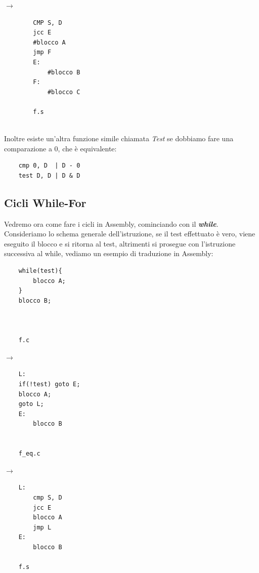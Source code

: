 \hfill
$\longrightarrow$
\hfill
\begin{minipage}{0.3\textwidth}
    \begin{verbatim}
        CMP S, D
        jcc E
        #blocco A
        jmp F
        E:
            #blocco B
        F:
            #blocco C
        
        f.s
    \end{verbatim}
\end{minipage}\bigskip\\
\noindent Inoltre esiste un'altra funzione simile chiamata \textit{Test} se dobbiamo fare una comparazione a 0, che è equivalente:
\begin{verbatim}
    cmp 0, D  | D - 0
    test D, D | D & D
\end{verbatim}

\subsection{Cicli While-For}
Vedremo ora come fare i cicli in Assembly, cominciando con il \textbf{\textit{while}}. Consideriamo lo schema generale dell'istruzione, se il test effettuato è vero, viene eseguito il blocco e si ritorna al test, altrimenti si prosegue con l'istruzione successiva al while, vediamo un esempio di traduzione in Assembly: \medskip\\ 
\begin{minipage}{0.2\textwidth}
    \begin{verbatim}
    while(test){
        blocco A;
    }
    blocco B;


    
    f.c
    \end{verbatim}
\end{minipage}
\hfill
$\longrightarrow$
\hfill
\begin{minipage}{0.2\textwidth}
    \begin{verbatim}
    L:
    if(!test) goto E;
    blocco A;
    goto L;
    E:
        blocco B


    f_eq.c
    \end{verbatim}
\end{minipage}
\hfill
$\longrightarrow$
\hfill
\begin{minipage}{0.2\textwidth}
    \begin{verbatim}
    L:
        cmp S, D
        jcc E
        blocco A
        jmp L
    E:
        blocco B
    
    f.s
    \end{verbatim}
\end{minipage}\medskip \\
